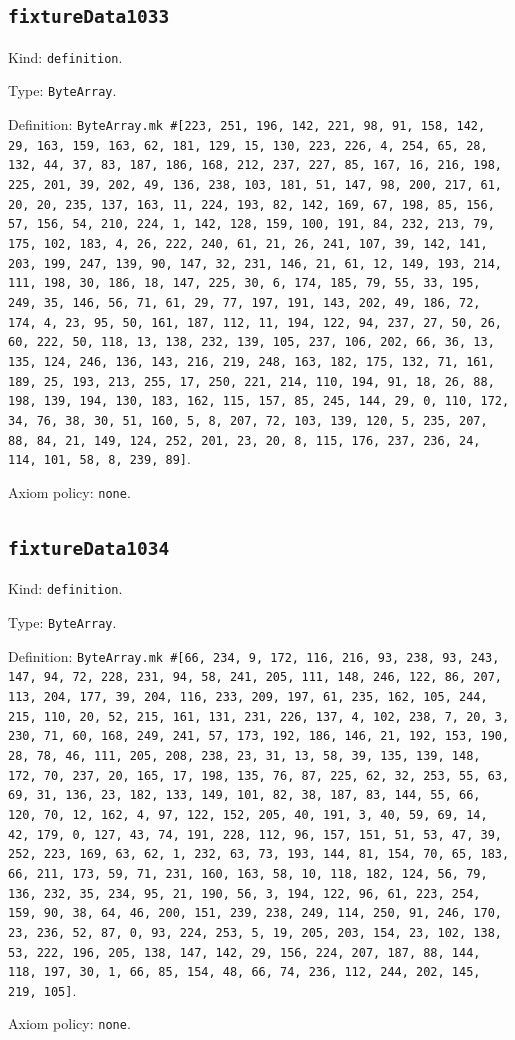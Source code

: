 \documentclass[11pt]{article}
\begin{document}
\subsection*{\texttt{fixtureData1033}}
\noindent Kind: \texttt{definition}.\par
\noindent Type: \texttt{ByteArray}.\par
\noindent Definition: \texttt{ByteArray.mk \#[223, 251, 196, 142, 221, 98, 91, 158, 142, 29, 163, 159, 163, 62, 181, 129, 15, 130, 223, 226, 4, 254, 65, 28, 132, 44, 37, 83, 187, 186, 168, 212, 237, 227, 85, 167, 16, 216, 198, 225, 201, 39, 202, 49, 136, 238, 103, 181, 51, 147, 98, 200, 217, 61, 20, 20, 235, 137, 163, 11, 224, 193, 82, 142, 169, 67, 198, 85, 156, 57, 156, 54, 210, 224, 1, 142, 128, 159, 100, 191, 84, 232, 213, 79, 175, 102, 183, 4, 26, 222, 240, 61, 21, 26, 241, 107, 39, 142, 141, 203, 199, 247, 139, 90, 147, 32, 231, 146, 21, 61, 12, 149, 193, 214, 111, 198, 30, 186, 18, 147, 225, 30, 6, 174, 185, 79, 55, 33, 195, 249, 35, 146, 56, 71, 61, 29, 77, 197, 191, 143, 202, 49, 186, 72, 174, 4, 23, 95, 50, 161, 187, 112, 11, 194, 122, 94, 237, 27, 50, 26, 60, 222, 50, 118, 13, 138, 232, 139, 105, 237, 106, 202, 66, 36, 13, 135, 124, 246, 136, 143, 216, 219, 248, 163, 182, 175, 132, 71, 161, 189, 25, 193, 213, 255, 17, 250, 221, 214, 110, 194, 91, 18, 26, 88, 198, 139, 194, 130, 183, 162, 115, 157, 85, 245, 144, 29, 0, 110, 172, 34, 76, 38, 30, 51, 160, 5, 8, 207, 72, 103, 139, 120, 5, 235, 207, 88, 84, 21, 149, 124, 252, 201, 23, 20, 8, 115, 176, 237, 236, 24, 114, 101, 58, 8, 239, 89]}.\par
\noindent Axiom policy: \texttt{none}.\par
\subsection*{\texttt{fixtureData1034}}
\noindent Kind: \texttt{definition}.\par
\noindent Type: \texttt{ByteArray}.\par
\noindent Definition: \texttt{ByteArray.mk \#[66, 234, 9, 172, 116, 216, 93, 238, 93, 243, 147, 94, 72, 228, 231, 94, 58, 241, 205, 111, 148, 246, 122, 86, 207, 113, 204, 177, 39, 204, 116, 233, 209, 197, 61, 235, 162, 105, 244, 215, 110, 20, 52, 215, 161, 131, 231, 226, 137, 4, 102, 238, 7, 20, 3, 230, 71, 60, 168, 249, 241, 57, 173, 192, 186, 146, 21, 192, 153, 190, 28, 78, 46, 111, 205, 208, 238, 23, 31, 13, 58, 39, 135, 139, 148, 172, 70, 237, 20, 165, 17, 198, 135, 76, 87, 225, 62, 32, 253, 55, 63, 69, 31, 136, 23, 182, 133, 149, 101, 82, 38, 187, 83, 144, 55, 66, 120, 70, 12, 162, 4, 97, 122, 152, 205, 40, 191, 3, 40, 59, 69, 14, 42, 179, 0, 127, 43, 74, 191, 228, 112, 96, 157, 151, 51, 53, 47, 39, 252, 223, 169, 63, 62, 1, 232, 63, 73, 193, 144, 81, 154, 70, 65, 183, 66, 211, 173, 59, 71, 231, 160, 163, 58, 10, 118, 182, 124, 56, 79, 136, 232, 35, 234, 95, 21, 190, 56, 3, 194, 122, 96, 61, 223, 254, 159, 90, 38, 64, 46, 200, 151, 239, 238, 249, 114, 250, 91, 246, 170, 23, 236, 52, 87, 0, 93, 224, 253, 5, 19, 205, 203, 154, 23, 102, 138, 53, 222, 196, 205, 138, 147, 142, 29, 156, 224, 207, 187, 88, 144, 118, 197, 30, 1, 66, 85, 154, 48, 66, 74, 236, 112, 244, 202, 145, 219, 105]}.\par
\noindent Axiom policy: \texttt{none}.\par
\end{document}
